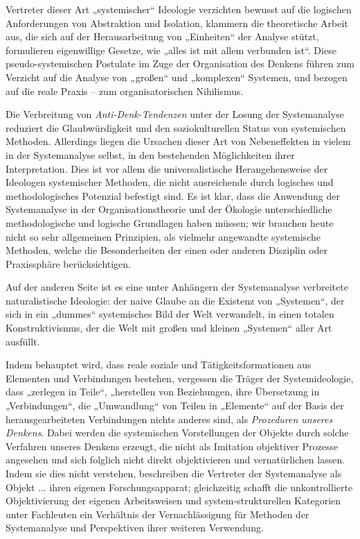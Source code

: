 \documentclass[11pt,a4paper]{article}
\begin{document}
Vertreter dieser Art „systemischer“ Ideologie verzichten bewusst auf die
logischen Anforderungen von Abstraktion und Isolation, klammern die
theoretische Arbeit aus, die sich auf der Herausarbeitung von „Einheiten“ der
Analyse stützt, formulieren eigenwillige Gesetze, wie „alles ist mit allem
verbunden ist“. Diese pseudo-systemischen Postulate im Zuge der Organisation
des Denkens führen zum Verzicht auf die Analyse von „großen“ und „komplexen“
Systemen, und bezogen auf die reale Praxis -- zum organisatorischen
Nihilismus.

Die Verbreitung von \emph{Anti-Denk-Tendenzen} unter der Losung der
Systemanalyse reduziert die Glaubwürdigkeit und den soziokulturellen Status
von systemischen Methoden. Allerdings liegen die Ursachen dieser Art von
Nebeneffekten in vielem in der Systemanalyse selbst, in den bestehenden
Möglichkeiten ihrer Interpretation.  Dies ist vor allem die universalistische
Herangehensweise der Ideologen systemischer Methoden, die nicht ausreichende
durch logisches und methodologisches Potenzial befestigt sind. Es ist klar,
dass die Anwendung der Systemanalyse in der Organisationstheorie und der
Ökologie unterschiedliche methodologische und logische Grundlagen haben
müssen; wir brauchen heute nicht so sehr allgemeinen Prinzipien, als vielmehr
angewandte systemische Methoden, welche die Besonderheiten der einen oder
anderen Disziplin oder Praxissphäre berücksichtigen.

Auf der anderen Seite ist es eine unter Anhängern der Systemanalyse
verbreitete naturalistische Ideologie: der naive Glaube an die Existenz von
„Systemen“, der sich in ein „dummes“ systemisches Bild der Welt verwandelt, in
einen totalen Konstruktivismus, der die Welt mit großen und kleinen „Systemen“
aller Art ausfüllt.

Indem behauptet wird, dass reale soziale und Tätigkeitsformationen aus
Elementen und Verbindungen bestehen, vergessen die Träger der Systemideologie,
dass „zerlegen in Teile“, „herstellen von Beziehungen, ihre Übersetzung in
„Verbindungen“, die „Umwandlung“ von Teilen in „Elemente“ auf der Basis der
herausgearbeiteten Verbindungen nichts anderes sind, als \emph{Prozeduren
  unseres Denkens}. Dabei werden die systemischen Vorstellungen der Objekte
durch solche Verfahren unseres Denkens erzeugt, die nicht als Imitation
objektiver Prozesse angesehen und sich folglich nicht direkt objektivieren und
vernatürlichen lassen. Indem sie dies nicht verstehen, beschreiben die
Vertreter der Systemanalyse als Objekt ... ihren eigenen Forschungsapparat;
gleichzeitig schafft die unkontrollierte Objektivierung der eigenen
Arbeitsweisen und system-strukturellen Kategorien unter Fachleuten ein
Verhältnis der Vernachlässigung für Methoden der Systemanalyse und
Perspektiven ihrer weiteren Verwendung.
\end{document}
